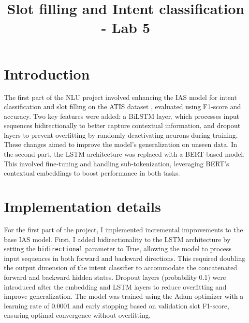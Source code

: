 \documentclass[a4paper]{article}
\title{Slot filling and Intent classification  - Lab 5}
\begin{document}
\maketitle
%
%
\section{Introduction}
The first part of the NLU project involved enhancing the IAS model for intent 
classification and slot filling on the ATIS dataset \cite{nlu-labs-unitn}, evaluated using F1-score and
 accuracy. Two key features were added: a BiLSTM layer, which processes input 
 sequences bidirectionally to better capture contextual information, and dropout 
 layers to prevent overfitting by randomly deactivating neurons during training.
 These changes aimed to improve the model’s generalization on unseen data. In the 
 second part, the LSTM architecture was replaced with a BERT-based model. This 
 involved fine-tuning and handling sub-tokenization, leveraging BERT’s contextual
 embeddings to boost performance in both tasks.
\section{Implementation details}
For the first part of the project, I implemented incremental improvements to the base IAS model.
First, I added bidirectionality to the LSTM architecture by setting the \texttt{bidirectional} parameter to True, allowing the model to process input sequences in both forward and backward directions. 
This required doubling the output dimension of the intent classifier to accommodate the concatenated forward and backward hidden states.
Dropout layers (probability 0.1) were introduced after the embedding and LSTM layers to reduce overfitting and improve generalization.
The model was trained using the Adam optimizer with a learning rate of 0.0001 and early stopping based on validation slot F1-score, ensuring optimal convergence without overfitting.
\end{document}
